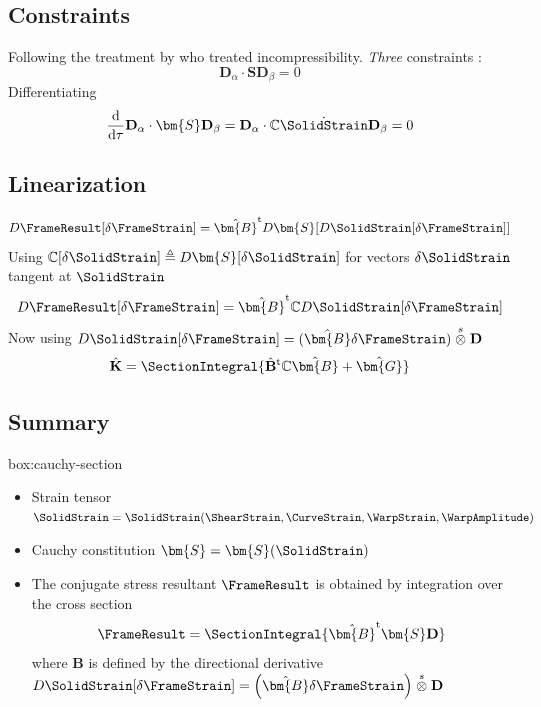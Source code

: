 \subsection{Constraints}
Following the treatment by \cite{steigmann2017notes} who treated incompressibility. 
\emph{Three} constraints :
\begin{equation}
    \mathbf{D}_{\alpha} \cdot \bm{S}\mathbf{D}_{\beta} = 0
\end{equation}
Differentiating
\begin{equation*}
    \frac{\mathrm{d}}{\mathrm{d} \tau} \mathbf{D}_{\alpha} \cdot \bm{S}\mathbf{D}_{\beta} 
    =  \mathbf{D}_{\alpha} \cdot \mathbb{C}\dot{\SolidStrain}\mathbf{D}_{\beta} = 0
\end{equation*}

\subsection{Linearization}
\begin{equation*}
    D {\FrameResult} [\delta \FrameStrain] = \hat{\bm{B}}^{\mathrm{t}}D \bm{S} [D \SolidStrain [\delta \FrameStrain]]
\end{equation*}
Using \(\mathbb{C}[\delta \SolidStrain] \triangleq D\bm{S}[\delta \SolidStrain]\) for vectors \(\delta \SolidStrain\) tangent at \(\SolidStrain\) 
\begin{equation*}
 D {\FrameResult} [\delta \FrameStrain] = \hat{\bm{B}}^{\mathrm{t}} \mathbb{C} D \SolidStrain [\delta \FrameStrain]
\end{equation*}
Now using \(D \SolidStrain [\delta \FrameStrain] = (\hat{\bm{B}}\delta \FrameStrain) \stackrel{s}{\otimes} \mathbf{D}\)
\begin{equation*}
\hat{\mathbf{K}} = \SectionIntegral{
    \hat{\mathbf{B}}^{\mathrm{t}} \mathbb{C}\hat{\bm{B}} + \hat{\bm{G}}
    }
\end{equation*}

\subsection{Summary}
\begin{ambox}{box:cauchy-section}

\begin{itemize}
    \item Strain tensor \(\SolidStrain = \SolidStrain(\ShearStrain,\CurveStrain,\WarpStrain,\WarpAmplitude)\)
    \item Cauchy constitution \(\bm{S} = \bm{S}(\SolidStrain)\)
    \item The conjugate stress resultant \(\FrameResult\) is obtained by integration over the cross section
    \[
    \FrameResult= \SectionIntegral{\hat{\bm{B}}^{\mathrm{t}} \bm{S}\mathbf{D}}\]
    where \(\hat{\bm{B}}\) is defined by the directional derivative \(D\SolidStrain[\delta\FrameStrain] = \left(\hat{\bm{B}}\delta\FrameStrain\right)\stackrel{s}{\otimes}\mathbf{D}\)
\end{itemize}
\end{ambox}

